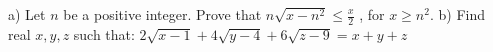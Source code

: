 a) Let $n$ be a positive integer. Prove that  $ n\sqrt {x-n^2}\leq \frac {x}{2}$ , for  $x\geq n^2$.
b) Find real $x,y,z$ such that: $ 2\sqrt {x-1} +4\sqrt {y-4} + 6\sqrt {z-9} = x+y+z$